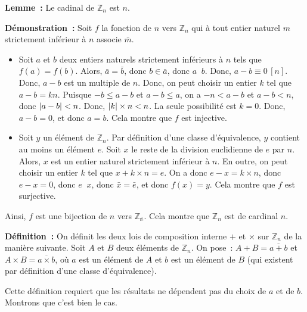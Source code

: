 \noindent\textbf{Lemme :} Le cadinal de $\mathbb{Z}_n$ est $n$.

\medskip

\noindent\textbf{Démonstration :}
    Soit $f$ la fonction de $n$ vers $\mathbb{Z}_n$ qui à tout entier naturel $m$ strictement inférieur à $n$ associe $\bar{m}$.
    \begin{itemize}
        \item Soit $a$ et $b$ deux entiers naturels strictement inférieurs à $n$ tels que $f(a) = f(b)$.
            Alors, $\bar{a} = \bar{b}$, donc $b \in \bar{a}$, donc $a \mathop{R_n} b$.
            Donc, $a - b \equiv 0 \, [n]$.
            Donc, $a - b$ est un multiple de $n$.
            Donc, on peut choisir un entier $k$ tel que $a-b = k n$.
            Puisque $-b \leq a-b$ et $a-b \leq a$, on a $-n < a-b$ et $a-b < n$, donc $\left\lvert a-b \right\rvert < n$. 
            Donc, $\left\lvert k \right\rvert \times n < n$. 
            La seule possibilité est $k = 0$. 
            Donc, $a - b = 0$, et donc $a = b$.
            Cela montre que $f$ est injective.
        \item Soit $y$ un élément de $\mathbb{Z}_n$.
            Par définition d'une classe d'équivalence, $y$ contient au moins un élément $e$.
            Soit $x$ le reste de la division euclidienne de $e$ par $n$.
            Alors, $x$ est un entier naturel strictement inférieur à $n$. 
            En outre, on peut choisir un entier $k$ tel que $x + k \times n = e$.
            On a donc $e - x = k \times n$, donc $e - x = 0$, donc $e \mathop{R_n} x$, donc $\bar{x} = \bar{e}$, et donc $f(x) = y$.
            Cela montre que $f$ est surjective.
    \end{itemize}
    Ainsi, $f$ est une bijection de $n$ vers $\mathbb{Z_n}$.
    Cela montre que $\mathbb{Z}_n$ est de cardinal $n$.

    \done

\medskip

\noindent\textbf{Définition :} On définit les deux lois de composition interne $+$ et $\times$ sur $\mathbb{Z}_n$ de la manière suivante.
    Soit $A$ et $B$ deux éléments de $\mathbb{Z}_n$.
    On pose : $A + B = \overline{a + b}$ et $A \times B = \overline{a \times b}$, où $a$ est un élément de $A$ et $b$ est un élément de $B$ (qui existent par définition d'une classe d'équivalence). 

\medskip

Cette définition requiert que les résultats ne dépendent pas du choix de $a$ et de $b$. 
Montrons que c'est bien le cas. 

